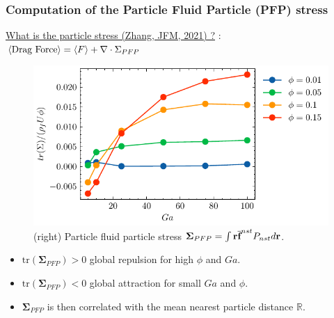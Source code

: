 \documentclass{sintefbeamer}
\begin{document}
\begin{frame}
  \frametitle{Computation of the Particle Fluid Particle (PFP) stress}
  \underline{What is the particle stress (Zhang, JFM, 2021) ?}  
   : $\left<\text{Drag Force}\right> = \left<F\right> + \mathbf{\nabla}\cdot \Sigma_{PFP}$
  \begin{figure}
    \includegraphics[height=0.23\textwidth]{image/HOMOGENEOUS/fPA/PFP.pdf}
    \caption{ 
      (right) Particle fluid particle stress $\mathbf{\Sigma}_{PFP} = \int \textbf{r}\overline{\textbf{f}}^{nst} P_{nst}d\textbf{r}$.
      }
  \end{figure}
  
\begin{itemize}
  \item $\text{tr}(\mathbf{\Sigma}_{PFP}) > 0$ global repulsion for high $\phi$ and $Ga$. 
  \item $\text{tr}(\mathbf{\Sigma}_{PFP}) < 0$ global attraction for small $Ga$ and $\phi$.
  \item  $\mathbf{\Sigma}_{PFP}$ is then correlated with the mean nearest particle distance $\mathbb{R}$. 
\end{itemize}

\end{frame}
\end{document}
